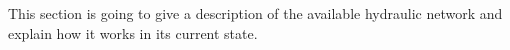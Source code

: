 This section is going to give a description of the available hydraulic network and explain how it works in its current state.   

